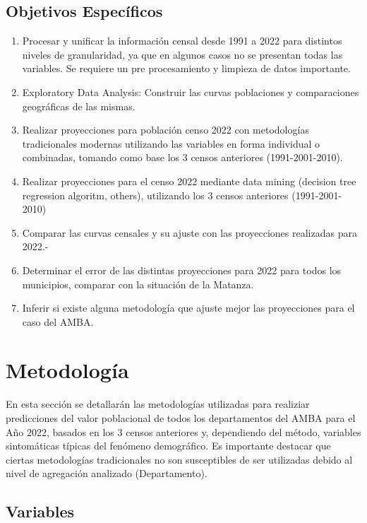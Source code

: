 \documentclass{article}
\theoremstyle{mytheoremstyle}
\theoremstyle{mytheoremstyle}
\theoremstyle{myproblemstyle}
\begin{document}
 \subsection{Objetivos Específicos}
\begin{enumerate}
  \item Procesar y unificar la información censal desde 1991 a 2022 para distintos niveles de granularidad, 
  ya que en algunos casos no se presentan todas las variables.  
  Se requiere un pre procesamiento y limpieza de datos importante.
  \item Exploratory Data Analysis: Construir las curvas poblaciones y comparaciones geográficas de las mismas.
  \item Realizar proyecciones para población censo 2022 con metodologías tradicionales modernas utilizando las
   variables en forma individual o combinadas, tomando como base los 3 censos anteriores (1991-2001-2010).
  \item Realizar proyecciones para el censo 2022 mediante data mining (decision tree regression algoritm, others),
   utilizando los 3 censos anteriores (1991-2001-2010)
  \item Comparar las curvas censales y su ajuste con las proyecciones realizadas para 2022.-
  \item Determinar el error de las distintas proyecciones para 2022 para todos los municipios, 
  comparar con la situación de la Matanza.  
  \item Inferir si existe alguna metodología que ajuste mejor las proyecciones para el caso del AMBA.
\end{enumerate}

\section{Metodología}
En esta sección se detallarán las metodologías utilizadas para realiziar predicciones del valor poblacional de todos los 
departamentos del AMBA para el Año 2022, basados en los 3 censos anteriores y, dependiendo del método, variables sintomáticas
típicas del fenómeno demográfico. Es importante destacar que ciertas metodologías tradicionales
 no son susceptibles de ser utilizadas debido al nivel de agregación analizado (Departamento).

\subsection{Variables}
\end{document}
